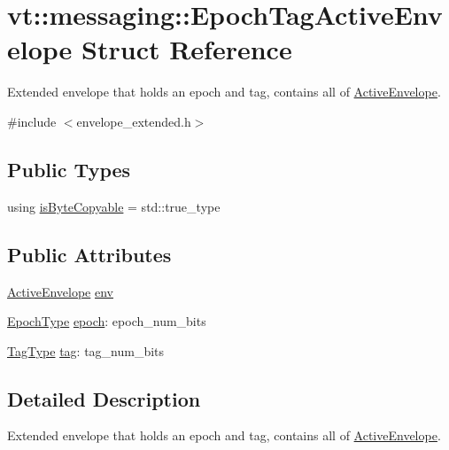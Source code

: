 \hypertarget{structvt_1_1messaging_1_1_epoch_tag_active_envelope}{}\section{vt\+:\+:messaging\+:\+:Epoch\+Tag\+Active\+Envelope Struct Reference}
\label{structvt_1_1messaging_1_1_epoch_tag_active_envelope}


Extended envelope that holds an epoch and tag, contains all of {\ttfamily \hyperlink{structvt_1_1messaging_1_1_active_envelope}{Active\+Envelope}}.  




{\ttfamily \#include $<$envelope\+\_\+extended.\+h$>$}

\subsection*{Public Types}
\begin{DoxyCompactItemize}
\item 
using \hyperlink{structvt_1_1messaging_1_1_epoch_tag_active_envelope_ae7178428c476ea23165e0622dcabf681}{is\+Byte\+Copyable} = std\+::true\+\_\+type
\end{DoxyCompactItemize}
\subsection*{Public Attributes}
\begin{DoxyCompactItemize}
\item 
\hyperlink{structvt_1_1messaging_1_1_active_envelope}{Active\+Envelope} \hyperlink{structvt_1_1messaging_1_1_epoch_tag_active_envelope_a9d1a68dc7a32fd13be13155794c03029}{env}
\item 
\hyperlink{namespacevt_a985a5adf291c34a3ca263b3378388236}{Epoch\+Type} \hyperlink{structvt_1_1messaging_1_1_epoch_tag_active_envelope_aaccd25acb58b516788297503ea8ea67e}{epoch}\+: epoch\+\_\+num\+\_\+bits
\item 
\hyperlink{namespacevt_a84ab281dae04a52a4b243d6bf62d0e52}{Tag\+Type} \hyperlink{structvt_1_1messaging_1_1_epoch_tag_active_envelope_aafb75781896b2eebe8cf1feae02c46f5}{tag}\+: tag\+\_\+num\+\_\+bits
\end{DoxyCompactItemize}


\subsection{Detailed Description}
Extended envelope that holds an epoch and tag, contains all of {\ttfamily \hyperlink{structvt_1_1messaging_1_1_active_envelope}{Active\+Envelope}}. 

